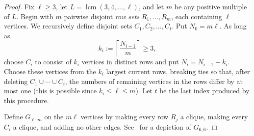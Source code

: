 \documentclass[a4paper,fleqn]{cas-sc}
\theoremstyle{remark}
\theoremstyle{plain}
\begin{document}
\begin{proof}
Fix $\ell\geq 3$, let
$L=\operatorname{lcm}(3,4,\ldots,\ell)$, and let $m$ be any positive
multiple of $L$. Begin with $m$ pairwise disjoint
\emph{row sets} $R_1,\ldots,R_m$, each containing $\ell$ vertices.
We recursively define disjoint sets $C_1,C_2,\ldots,C_t$. Put
$N_0=m\ell$. As long as
\[
   k_i:=\left\lceil\frac{N_{i-1}}{m}\right\rceil\geq 3,
\]
choose $C_i$ to consist of $k_i$ vertices in distinct rows and put
$N_i=N_{i-1}-k_i$. Choose these vertices from the $k_i$ largest current rows, breaking ties so that, after deleting
$C_1\cup\cdots\cup C_i$, the numbers of remaining vertices in the
rows differ by at most one (this is possible since $k_i\leq\ell
\leq m$). Let $t$ be the last index produced by this procedure.

Define $G_{\ell,m}$ on the $m\ell$ vertices by making every row
$R_j$ a clique, making every $C_i$ a clique, and adding no other
edges. See~ for a depiction of $G_{6,6}$.

        


\end{proof}
\end{document}
